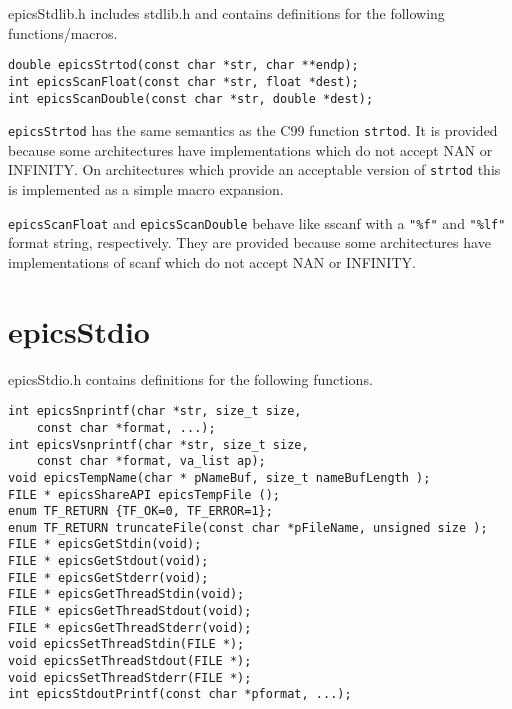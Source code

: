 epicsStdlib.h includes stdlib.h and contains definitions for the following functions/macros.

\begin{verbatim}
double epicsStrtod(const char *str, char **endp);
int epicsScanFloat(const char *str, float *dest);
int epicsScanDouble(const char *str, double *dest);
\end{verbatim}

\verb|epicsStrtod| has the same semantics as the C99 function \verb|strtod|.  It is provided because some architectures have 
implementations which do not accept NAN or INFINITY.   On architectures which provide an acceptable version of 
\verb|strtod| this is implemented as a simple macro expansion.

\verb|epicsScanFloat| and \verb|epicsScanDouble| behave like sscanf with a \verb|"%f"| and \verb|"%lf"| format string, respectively.  
They are provided because some architectures have implementations of scanf which do not accept NAN or INFINITY.


\section{epicsStdio}

epicsStdio.h contains definitions for the following functions.

\begin{verbatim}
int epicsSnprintf(char *str, size_t size,
    const char *format, ...);
int epicsVsnprintf(char *str, size_t size,
    const char *format, va_list ap);
void epicsTempName(char * pNameBuf, size_t nameBufLength );
FILE * epicsShareAPI epicsTempFile ();
enum TF_RETURN {TF_OK=0, TF_ERROR=1};
enum TF_RETURN truncateFile(const char *pFileName, unsigned size );
FILE * epicsGetStdin(void);
FILE * epicsGetStdout(void);
FILE * epicsGetStderr(void);
FILE * epicsGetThreadStdin(void);
FILE * epicsGetThreadStdout(void);
FILE * epicsGetThreadStderr(void);
void epicsSetThreadStdin(FILE *);
void epicsSetThreadStdout(FILE *);
void epicsSetThreadStderr(FILE *);
int epicsStdoutPrintf(const char *pformat, ...);
\end{verbatim}

